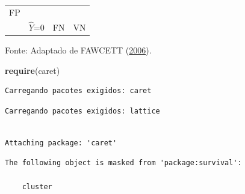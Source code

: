 \documentclass[12pt,brazil,oneside]{book}
\newenvironment{Shaded}{\begin{snugshade}}{\end{snugshade}}
\newcommand{\DataTypeTok}[1]{\textcolor[rgb]{0.13,0.29,0.53}{#1}}
\newcommand{\FloatTok}[1]{\textcolor[rgb]{0.00,0.00,0.81}{#1}}
\newcommand{\KeywordTok}[1]{\textcolor[rgb]{0.13,0.29,0.53}{\textbf{#1}}}
\newcommand{\NormalTok}[1]{#1}
\newcommand{\OperatorTok}[1]{\textcolor[rgb]{0.81,0.36,0.00}{\textbf{#1}}}
\newcommand{\StringTok}[1]{\textcolor[rgb]{0.31,0.60,0.02}{#1}}
\begin{document}
\begin{longtable}[]{@{}llll@{}}
\begin{minipage}[t]{0.12\columnwidth}
FP\strut
\end{minipage}\tabularnewline
\begin{minipage}[t]{0.25\columnwidth}\raggedright
\strut
\end{minipage} & \begin{minipage}[t]{0.15\columnwidth}\raggedright
\(\hat Y\)=0\strut
\end{minipage} & \begin{minipage}[t]{0.25\columnwidth}\raggedright
FN\strut
\end{minipage} & \begin{minipage}[t]{0.12\columnwidth}\raggedright
VN\strut
\end{minipage}\tabularnewline
\bottomrule
\end{longtable}

Fonte: Adaptado de FAWCETT (\protect\hyperlink{ref-Fawcett2006}{2006}).

\begin{Shaded}
\begin{Highlighting}[]
\KeywordTok{require}\NormalTok{(caret)}
\end{Highlighting}
\end{Shaded}

\begin{verbatim}
Carregando pacotes exigidos: caret
\end{verbatim}

\begin{verbatim}
Carregando pacotes exigidos: lattice
\end{verbatim}

\begin{verbatim}

Attaching package: 'caret'
\end{verbatim}

\begin{verbatim}
The following object is masked from 'package:survival':

    cluster
\end{verbatim}

\begin{Shaded}
\end{Shaded}
\end{document}
